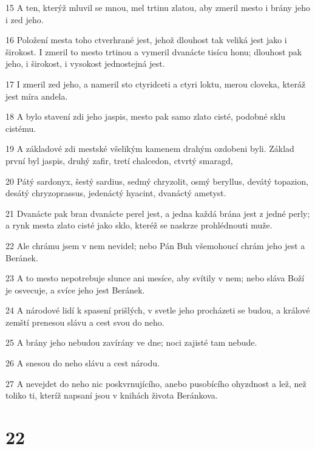 \par 15 A ten, kterýž mluvil se mnou, mel trtinu zlatou, aby zmeril mesto i brány jeho i zed jeho.
\par 16 Položení mesta toho ctverhrané jest, jehož dlouhost tak veliká jest jako i širokost. I zmeril to mesto trtinou a vymeril dvanácte tisícu honu; dlouhost pak jeho, i širokost, i vysokost jednostejná jest.
\par 17 I zmeril zed jeho, a nameril sto ctyridceti a ctyri loktu, merou cloveka, kteráž jest míra andela.
\par 18 A bylo stavení zdi jeho jaspis, mesto pak samo zlato cisté, podobné sklu cistému.
\par 19 A základové zdi mestské všelikým kamenem drahým ozdobeni byli. Základ první byl jaspis, druhý zafir, tretí chalcedon, ctvrtý smaragd,
\par 20 Pátý sardonyx, šestý sardius, sedmý chryzolit, osmý beryllus, devátý topazion, desátý chryzoprassus, jedenáctý hyacint, dvanáctý ametyst.
\par 21 Dvanácte pak bran dvanácte perel jest, a jedna každá brána jest z jedné perly; a rynk mesta zlato cisté jako sklo, kteréž se naskrze prohlédnouti muže.
\par 22 Ale chrámu jsem v nem nevidel; nebo Pán Buh všemohoucí chrám jeho jest a Beránek.
\par 23 A to mesto nepotrebuje slunce ani mesíce, aby svítily v nem; nebo sláva Boží je osvecuje, a svíce jeho jest Beránek.
\par 24 A národové lidí k spasení prišlých, v svetle jeho procházeti se budou, a králové zemští prenesou slávu a cest svou do neho.
\par 25 A brány jeho nebudou zavírány ve dne; noci zajisté tam nebude.
\par 26 A snesou do neho slávu a cest národu.
\par 27 A nevejdet do neho nic poskvrnujícího, anebo pusobícího ohyzdnost a lež, než toliko ti, kteríž napsaní jsou v knihách života Beránkova.

\chapter{22}

